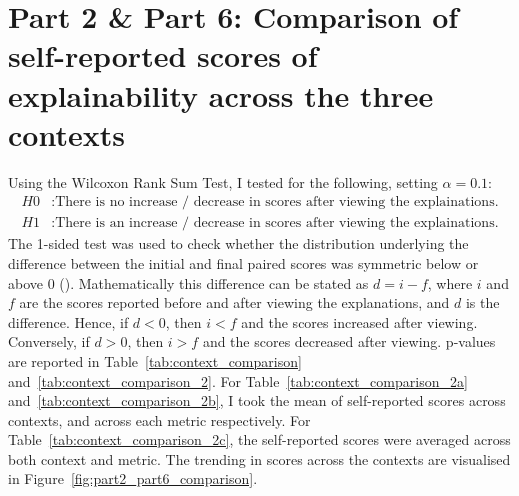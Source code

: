 \section{Part 2 \& Part 6: Comparison of self-reported scores of explainability across the three contexts}
\label{sec:three_contexts_comparison}
Using the Wilcoxon Rank Sum Test, I tested for the following, setting $\alpha = 0.1$: 
\begin{align*}
    H0&: \text{There is no increase / decrease in scores after viewing the explainations.} \\
    H1&: \text{There is an increase / decrease in scores after viewing the explainations.}
\end{align*}
The 1-sided test was used to check whether the distribution underlying the difference between the initial and final paired scores was symmetric below or above 0 (\cite{scipy}). Mathematically this difference can be stated as $d = i - f$, where $i$ and $f$ are the scores reported before and after viewing the explanations, and $d$ is the difference. Hence, if $d < 0$, then $i < f$ and the scores increased after viewing. Conversely, if $d > 0$, then $i > f$ and the scores decreased after viewing. p-values are reported in Table~\ref{tab:context_comparison} and~\ref{tab:context_comparison_2}. For Table~\ref{tab:context_comparison_2a} and~\ref{tab:context_comparison_2b}, I took the mean of self-reported scores across contexts, and across each metric respectively. For Table~\ref{tab:context_comparison_2c}, the self-reported scores were averaged across both context and metric. The trending in scores across the contexts are visualised in Figure~\ref{fig:part2_part6_comparison}.

\begin{table}[!ht]
    \centering
    \caption{p-values comparing whether there was a statistically significant increase / decrease in the explainability scores before and after viewing explanations.}
    \label{tab:context_comparison}
\end{table}

